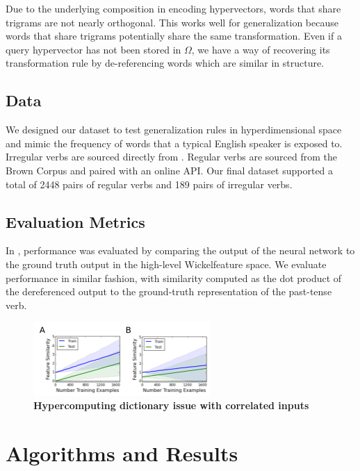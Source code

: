 \documentclass{article}
\begin{document}
Due to the underlying composition in encoding hypervectors, words that share trigrams are not nearly orthogonal. This works well for generalization because words that share trigrams potentially share the same transformation. Even if a query hypervector has not been stored in $\Omega$, we have a way of recovering its transformation rule by de-referencing words which are similar in structure.

\subsection{Data}
We designed our dataset to test generalization rules in hyperdimensional space and mimic the frequency of words that a typical English speaker is exposed to. Irregular verbs are sourced directly from \citet{Rumelhart1986a}. Regular verbs are sourced from the Brown Corpus and paired with an online API. Our final dataset supported a total of 2448 pairs of regular verbs and 189 pairs of irregular verbs. 
    
\subsection{Evaluation Metrics}
In \citet{Rumelhart1986a}, performance was evaluated by comparing the output of the neural network to the ground truth output in the high-level Wickelfeature space. We evaluate performance in similar fashion, with similarity computed as the dot product of the dereferenced output to the ground-truth representation of the past-tense verb. 

\begin{figure}
\centering
\includegraphics[width=0.6\textwidth]{dictionary_issue-170518.png}
\caption{\textbf{Hypercomputing dictionary issue with correlated inputs}}
\end{figure}

\section{Algorithms and Results}
\end{document}
